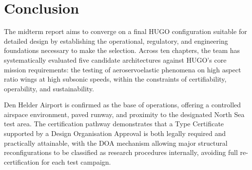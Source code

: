 \chapter{Conclusion}

The midterm report aims to converge on a final HUGO configuration suitable for detailed design by establishing the operational, regulatory, and engineering foundations necessary to make the selection. Across ten chapters, the team has systematically evaluated five candidate architectures against HUGO's core mission requirements: the testing of aeroservoelastic phenomena on high aspect ratio wings at high subsonic speeds, within the constraints of certifiability, operability, and sustainability.

Den Helder Airport is confirmed as the base of operations, offering a controlled airspace environment, paved runway, and proximity to the designated North Sea test area. The certification pathway demonstrates that a Type Certificate supported by a Design Organisation Approval is both legally required and practically attainable, with the DOA mechanism allowing major structural reconfigurations to be classified as research procedures internally, avoiding full re-certification for each test campaign.

